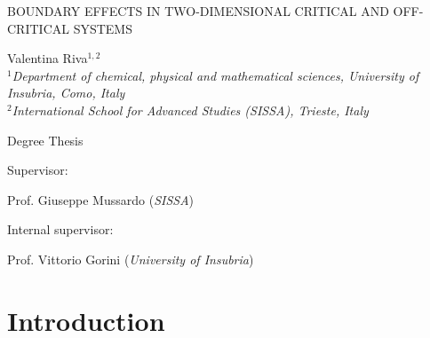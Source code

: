 \documentclass[a4paper,12pt]{report}
\begin{document}
\setcounter{page}{0} \topmargin 0pt \oddsidemargin 5mm
\renewcommand{\thefootnote}{\arabic{footnote}}
\newpage
\setcounter{page}{0}




\begin{titlepage}



\vspace{1cm}



\begin{center}\huge
BOUNDARY EFFECTS IN TWO-DIMENSIONAL CRITICAL AND OFF-CRITICAL SYSTEMS
\end{center}

\vspace{1cm}

\begin{center}
{\Large Valentina Riva$^{1,2}$} \\
\vspace{0.5cm} {\em $^{1}$Department of chemical, physical and mathematical sciences,
University of Insubria, Como, Italy}\\
\vspace{0.3cm} {\em $^{2}$International School for Advanced Studies (SISSA), Trieste, Italy }
\end{center}

\vspace{2cm}

\begin{center}\Large
Degree Thesis
\end{center}

\vspace{1cm}


\begin{flushleft}\large
Supervisor:

Prof. Giuseppe Mussardo \quad (\textit{SISSA})

\vspace{0.5cm}

Internal supervisor:

Prof. Vittorio Gorini \quad (\textit{University of Insubria})
\end{flushleft}


\end{titlepage}



\tableofcontents

\newpage

\chapter{Introduction}
\end{document}
